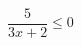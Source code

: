\begin{ex}[type=inequality]
	\begin{condition}
		\( \dfrac{5}{3x+2}\le0 \)
	\end{condition}
\end{ex}